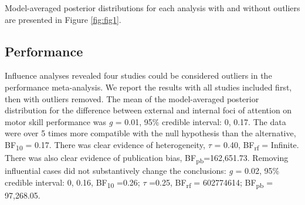 \documentclass[
  man, donotrepeattitle,floatsintext]{apa7}
\begin{document}
Model-averaged posterior distributions for each analysis with and without outliers are presented in Figure \ref{fig:fig1}.

\hypertarget{performance}{%
\subsection{Performance}\label{performance}}

Influence analyses revealed four studies could be considered outliers in the performance meta-analysis. We report the results with all studies included first, then with outliers removed. The mean of the model-averaged posterior distribution for the difference between external and internal foci of attention on motor skill performance was \emph{g} = 0.01, 95\% credible interval: 0, 0.17. The data were over 5 times more compatible with the null hypothesis than the alternative, BF\textsubscript{10} = 0.17. There was clear evidence of heterogeneity, \(\tau\) = 0.40, BF\textsubscript{rf} = Infinite. There was also clear evidence of publication bias, BF\textsubscript{pb}=162,651.73. Removing influential cases did not substantively change the conclusions: \emph{g} = 0.02, 95\% credible interval: 0, 0.16, BF\textsubscript{10} =0.26; \(\tau\) =0.25, BF\textsubscript{rf} = 602774614; BF\textsubscript{pb} = 97,268.05.

\clearpage
\end{document}
